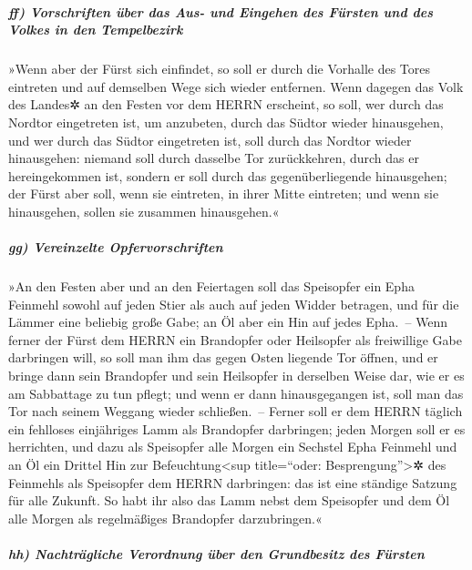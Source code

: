 \hypertarget{ff-vorschriften-uxfcber-das-aus--und-eingehen-des-fuxfcrsten-und-des-volkes-in-den-tempelbezirk}{%
\subparagraph{ff) Vorschriften über das Aus- und Eingehen des Fürsten
und des Volkes in den
Tempelbezirk}\label{ff-vorschriften-uxfcber-das-aus--und-eingehen-des-fuxfcrsten-und-des-volkes-in-den-tempelbezirk}}

»Wenn aber der Fürst sich einfindet, so soll er durch die
Vorhalle des Tores eintreten und auf demselben Wege sich wieder
entfernen. Wenn dagegen das Volk des Landes✲ an den Festen
vor dem HERRN erscheint, so soll, wer durch das Nordtor eingetreten ist,
um anzubeten, durch das Südtor wieder hinausgehen, und wer durch das
Südtor eingetreten ist, soll durch das Nordtor wieder hinausgehen:
niemand soll durch dasselbe Tor zurückkehren, durch das er
hereingekommen ist, sondern er soll durch das gegenüberliegende
hinausgehen; der Fürst aber soll, wenn sie eintreten, in
ihrer Mitte eintreten; und wenn sie hinausgehen, sollen sie zusammen
hinausgehen.«

\hypertarget{gg-vereinzelte-opfervorschriften}{%
\subparagraph{gg) Vereinzelte
Opfervorschriften}\label{gg-vereinzelte-opfervorschriften}}

»An den Festen aber und an den Feiertagen soll das
Speisopfer ein Epha Feinmehl sowohl auf jeden Stier als auch auf jeden
Widder betragen, und für die Lämmer eine beliebig große Gabe; an Öl aber
ein Hin auf jedes Epha.~-- Wenn ferner der Fürst dem
HERRN ein Brandopfer oder Heilsopfer als freiwillige Gabe darbringen
will, so soll man ihm das gegen Osten liegende Tor öffnen, und er bringe
dann sein Brandopfer und sein Heilsopfer in derselben Weise dar, wie er
es am Sabbattage zu tun pflegt; und wenn er dann hinausgegangen ist,
soll man das Tor nach seinem Weggang wieder schließen.~--
Ferner soll er dem HERRN täglich ein fehlloses
einjähriges Lamm als Brandopfer darbringen; jeden Morgen soll er es
herrichten, und dazu als Speisopfer alle Morgen ein
Sechstel Epha Feinmehl und an Öl ein Drittel Hin zur
Befeuchtung\textless sup title=``oder: Besprengung''\textgreater✲ des
Feinmehls als Speisopfer dem HERRN darbringen: das ist eine ständige
Satzung für alle Zukunft. So habt ihr also das Lamm nebst
dem Speisopfer und dem Öl alle Morgen als regelmäßiges Brandopfer
darzubringen.«

\hypertarget{hh-nachtruxe4gliche-verordnung-uxfcber-den-grundbesitz-des-fuxfcrsten}{%
\subparagraph{hh) Nachträgliche Verordnung über den Grundbesitz des
Fürsten}\label{hh-nachtruxe4gliche-verordnung-uxfcber-den-grundbesitz-des-fuxfcrsten}}


